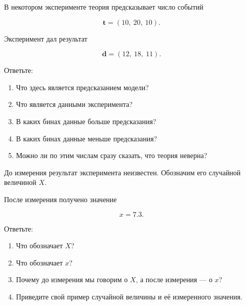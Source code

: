 \documentclass[
  russian,
  11pt,
  a4paper,
  open=any]{scrbook}
\providecommand{\tightlist}{%
  \setlength{\itemsep}{0pt}\setlength{\parskip}{0pt}}
\begin{document}
\begin{semanticpdfbox}[colback=BookCoralSoft,borderline west={1.2mm}{0pt}{BookCoral}]

\par\nopagebreak[4]\vspace{1.2mm}

В некотором эксперименте теория предсказывает число событий

\[
\mathbf{t}=(10,\ 20,\ 10).
\]

Эксперимент дал результат

\[
\mathbf{d}=(12,\ 18,\ 11).
\]

Ответьте:

\begin{enumerate}
\def\labelenumi{\arabic{enumi}.}
\tightlist
\item
  Что здесь является предсказанием модели?
\item
  Что является данными эксперимента?
\item
  В каких бинах данные больше предсказания?
\item
  В каких бинах данные меньше предсказания?
\item
  Можно ли по этим числам сразу сказать, что теория неверна?
\end{enumerate}

\end{semanticpdfbox}

\begin{semanticpdfbox}[colback=BookCoralSoft,borderline west={1.2mm}{0pt}{BookCoral}]

\par\nopagebreak[4]\vspace{1.2mm}

До измерения результат эксперимента неизвестен. Обозначим его случайной
величиной \(X\).

После измерения получено значение

\[
x=7.3.
\]

Ответьте:

\begin{enumerate}
\def\labelenumi{\arabic{enumi}.}
\tightlist
\item
  Что обозначает \(X\)?
\item
  Что обозначает \(x\)?
\item
  Почему до измерения мы говорим о \(X\), а после измерения --- о \(x\)?
\item
  Приведите свой пример случайной величины и её измеренного значения.
\end{enumerate}

\end{semanticpdfbox}
\end{document}
